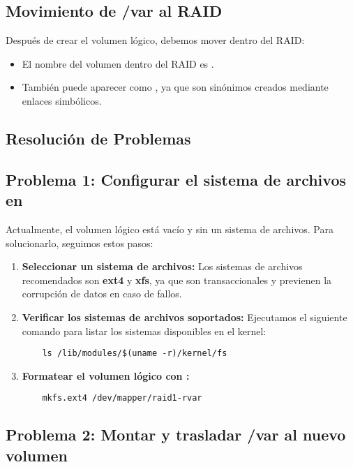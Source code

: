 \subsection{Movimiento de /var al RAID}
Después de crear el volumen lógico, debemos mover  dentro del RAID:

\begin{itemize}
    \item El nombre del volumen dentro del RAID es .
    \item También puede aparecer como , ya que son sinónimos creados mediante enlaces simbólicos.
\end{itemize}

\subsection{Resolución de Problemas}

\subsection{Problema 1: Configurar el sistema de archivos en }

Actualmente, el volumen lógico  está vacío y sin un sistema de archivos. Para solucionarlo, seguimos estos pasos:

\begin{enumerate}
    \item \textbf{Seleccionar un sistema de archivos:}  
    Los sistemas de archivos recomendados son \textbf{ext4} y \textbf{xfs}, ya que son transaccionales y previenen la corrupción de datos en caso de fallos.  
    \item \textbf{Verificar los sistemas de archivos soportados:}  
    Ejecutamos el siguiente comando para listar los sistemas disponibles en el kernel:
    \begin{verbatim}
    ls /lib/modules/$(uname -r)/kernel/fs
    \end{verbatim}
    \item \textbf{Formatear el volumen lógico con :}
    \begin{verbatim}
    mkfs.ext4 /dev/mapper/raid1-rvar
    \end{verbatim}
\end{enumerate}

\subsection{Problema 2: Montar y trasladar /var al nuevo volumen}

